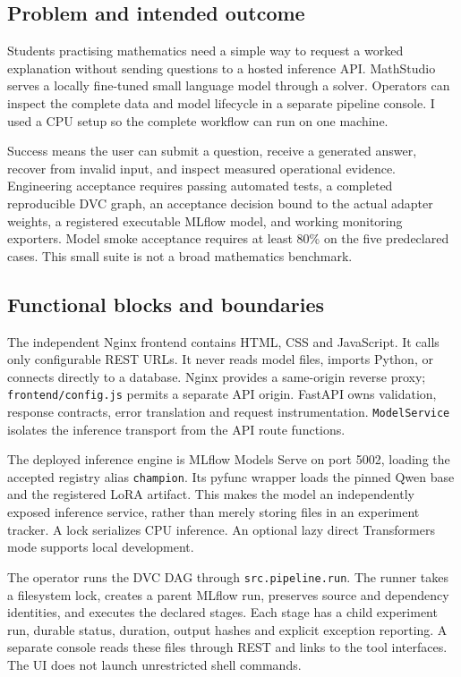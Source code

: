 \documentclass[11pt,a4paper]{article}
\begin{document}
\subsection*{Problem and intended outcome}
Students practising mathematics need a simple way to request a worked explanation without sending questions to a hosted inference API. MathStudio serves a locally fine-tuned small language model through a solver. Operators can inspect the complete data and model lifecycle in a separate pipeline console. I used a CPU setup so the complete workflow can run on one machine.

Success means the user can submit a question, receive a generated answer, recover from invalid input, and inspect measured operational evidence. Engineering acceptance requires passing automated tests, a completed reproducible DVC graph, an acceptance decision bound to the actual adapter weights, a registered executable MLflow model, and working monitoring exporters. Model smoke acceptance requires at least 80\% on the five predeclared cases. This small suite is not a broad mathematics benchmark.

\subsection*{Functional blocks and boundaries}
The independent Nginx frontend contains HTML, CSS and JavaScript. It calls only configurable REST URLs. It never reads model files, imports Python, or connects directly to a database. Nginx provides a same-origin reverse proxy; \texttt{frontend/\allowbreak{}config.\allowbreak{}js} permits a separate API origin. FastAPI owns validation, response contracts, error translation and request instrumentation. \texttt{ModelService} isolates the inference transport from the API route functions.

The deployed inference engine is MLflow Models Serve on port 5002, loading the accepted registry alias \texttt{champion}. Its pyfunc wrapper loads the pinned Qwen base and the registered LoRA artifact. This makes the model an independently exposed inference service, rather than merely storing files in an experiment tracker. A lock serializes CPU inference. An optional lazy direct Transformers mode supports local development.

The operator runs the DVC DAG through \texttt{src.\allowbreak{}pipeline.\allowbreak{}run}. The runner takes a filesystem lock, creates a parent MLflow run, preserves source and dependency identities, and executes the declared stages. Each stage has a child experiment run, durable status, duration, output hashes and explicit exception reporting. A separate console reads these files through REST and links to the tool interfaces. The UI does not launch unrestricted shell commands.
\end{document}
